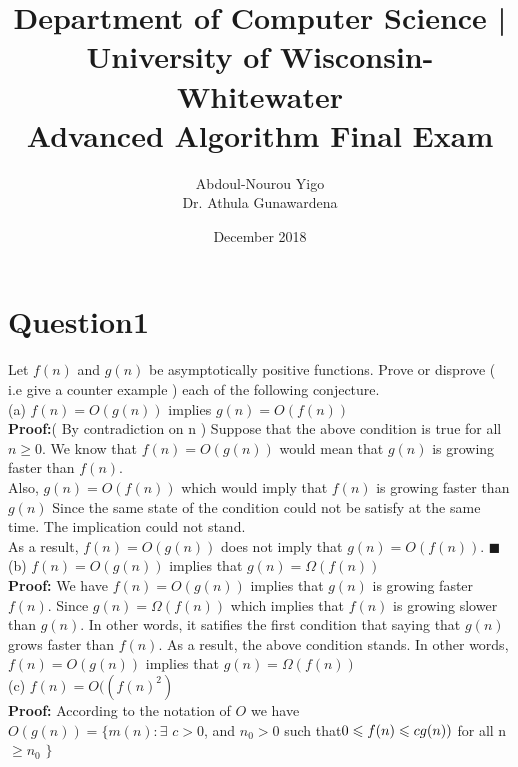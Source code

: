 \documentclass[12]{article}
\title{Department of Computer Science | University of Wisconsin-Whitewater \\
Advanced Algorithm Final Exam}
\author{Abdoul-Nourou Yigo \\
Dr. Athula Gunawardena}
\date{December 2018}
\begin{document}



\maketitle

\section{Question1}
Let $f(n)$ and $g(n)$ be asymptotically positive functions. Prove or disprove ( i.e give a counter example ) each of the following conjecture.\\

(a) $f(n) = O(g(n))$ implies $g(n) = O(f(n))$\\

\textbf{Proof:}( By contradiction on n ) 
Suppose that the above condition is true for all $n \geq 0$.
We know that  $f(n) = O(g(n))$ would mean that $g(n)$ is growing faster than $f(n)$.\\
Also, $g(n) =  O(f(n))$ which would imply that $f(n)$ is growing faster than $g(n)$
Since the same state of the condition could not be satisfy at the same time. The implication could not stand.\\ 
As a result,  $f(n) = O(g(n))$ does not imply that $g(n) = O(f(n))$.  $\blacksquare$\\

(b) $f(n) = O(g(n))$ implies that $g(n) = \Omega(f(n))$\\

\textbf{Proof:} We have $f(n) = O(g(n)) $ implies that $g(n)$ is growing faster $f(n)$. Since $g(n) = \Omega(f(n))$ which implies that $f(n)$ is growing slower than $g(n)$. In other words, it satifies the first condition that saying that $g(n)$ grows faster than $f(n)$. As a result, the above condition stands. In other words,   $f(n) = O(g(n))$ implies that $g(n) = \Omega(f(n))$ \\

(c) $f(n) = O((f(n)^2)$ \\

\textbf{Proof:}
According to the notation of $O$ we have\\
$O(g(n)) = \lbrace m(n):\exists$ $c>0$, and $n_0>0$ such that$\linebreak 0\leqslant f(n) \leqslant cg(n))$ for all n $\geqslant n_0$ $\rbrace$\\
\end{document}
